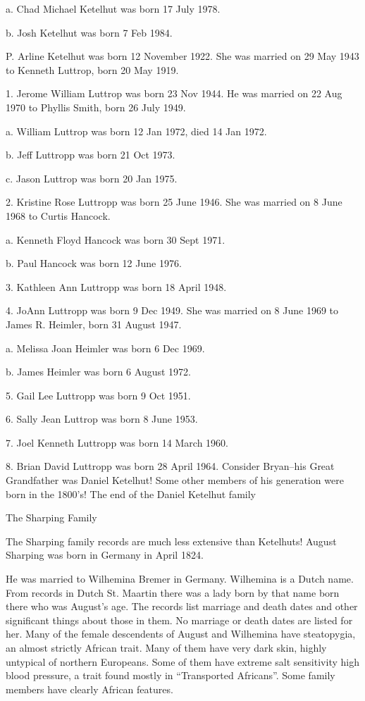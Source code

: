 \documentclass[a4paper]{article}
\begin{document}
a. Chad Michael Ketelhut was born 17 July 1978.

b. Josh Ketelhut was born 7 Feb 1984.  

P. Arline Ketelhut was born 12 November 1922.  She was married on 29 May 1943 to Kenneth Luttrop, born 20 May 1919.

1. Jerome William Luttrop was born 23 Nov 1944.  He was married on 22 Aug 1970 to Phyllis Smith, born 26 July 1949.

a. William Luttrop was born 12 Jan 1972, died 14 Jan 1972.

b. Jeff Luttropp was born 21 Oct 1973.

c. Jason Luttrop was born 20 Jan 1975.

2. Kristine Rose Luttropp was born 25 June 1946.  She was married on 8 June 1968 to Curtis Hancock.  

a. Kenneth Floyd Hancock was born 30 Sept 1971.

b. Paul Hancock was born 12 June 1976.

3. Kathleen Ann Luttropp was born 18 April 1948.

4. JoAnn Luttropp was born 9 Dec 1949.  She was married on 8 June 1969 to James R. Heimler, born 31 August 1947.

a. Melissa Joan Heimler was born 6 Dec 1969.

b. James Heimler was born 6 August 1972.

5. Gail Lee Luttropp was born 9 Oct 1951.

6. Sally Jean Luttrop was born 8 June 1953.

7. Joel Kenneth Luttropp was born 14 March 1960.

8. Brian David Luttropp was born 28 April 1964.  Consider Bryan--his Great Grandfather was Daniel Ketelhut!  Some other members of his generation were born in the 1800's!
\vskip 4mm
 The end of the Daniel Ketelhut family 

\pagebreak

{\Huge \noindent The Sharping Family}
\vskip 5mm


The Sharping family records are much less extensive than Ketelhuts!  August Sharping was born in Germany in April 1824.  

He was married to Wilhemina Bremer in Germany.  Wilhemina is a Dutch name.  From records in Dutch St. Maartin there was a lady born by that name born there who was August's age.  The records list marriage and death dates and other significant things about those in them.  No marriage or death dates are listed for her.  Many of the female descendents of August and Wilhemina have steatopygia, an almost strictly African trait. Many of them have very dark skin, highly untypical of northern Europeans.  Some of them have extreme salt sensitivity high blood pressure, a trait found mostly in ``Transported Africans''.  Some family members have clearly African features.  
\end{document}
